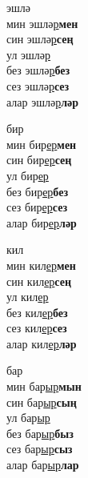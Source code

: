 \begin{multicols}{4}
\begin{enumerate}
\begin{minipage}{\linewidth}
    \item
    эшлә\\
    мин эшлә\underline{р}\textbf{мен}\\
    син эшлә\underline{р}\textbf{сең}\\
    ул эшлә\underline{р}\\
    без эшлә\underline{р}\textbf{без}\\
    сез эшлә\underline{р}\textbf{сез}\\
    алар эшлә\underline{р}\textbf{ләр}\\
\end{minipage}

\begin{minipage}{\linewidth}
    \item
    бир\\
    мин бир\underline{ер}\textbf{мен}\\
    син бир\underline{ер}\textbf{сең}\\
    ул бир\underline{ер}\\
    без бир\underline{ер}\textbf{без}\\
    сез бир\underline{ер}\textbf{сез}\\
    алар бир\underline{ер}\textbf{ләр}\\
\end{minipage}

\begin{minipage}{\linewidth}
    \item
    кил\\
    мин кил\underline{ер}\textbf{мен}\\
    син кил\underline{ер}\textbf{сең}\\
    ул кил\underline{ер}\\
    без кил\underline{ер}\textbf{без}\\
    сез кил\underline{ер}\textbf{сез}\\
    алар кил\underline{ер}\textbf{ләр}\\
\end{minipage}

\begin{minipage}{\linewidth}
    \item
    бар\\
    мин бар\underline{ыр}\textbf{мын}\\
    син бар\underline{ыр}\textbf{сың}\\
    ул бар\underline{ыр}\\
    без бар\underline{ыр}\textbf{быз}\\
    сез бар\underline{ыр}\textbf{сыз}\\
    алар бар\underline{ыр}\textbf{лар}\\
\end{minipage}


\end{enumerate}
\end{multicols}
